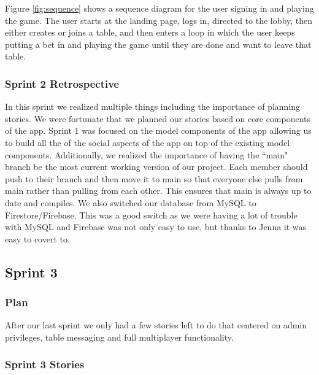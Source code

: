 \noindent Figure \ref{fig:sequence} shows a sequence diagram for the user signing in and playing the game. The user starts at the landing page, logs in, directed to the lobby, then either creates or joins a table, and then enters a loop in which the user keeps putting a bet in and playing the game until they are done and want to leave that table. 

\subsubsection{Sprint 2 Retrospective}
In this sprint we realized multiple things including the importance of planning stories. We were fortunate that we planned our stories based on core components of the app. Sprint 1 was focused on the model components of the app allowing us to build all the of the social aspects of the app on top of the existing model components. Additionally, we realized the importance of having the ``main" branch be the most current working version of our project. Each member should push to their branch and then move it to main so that everyone else pulls from main rather than pulling from each other. This ensures that main is always up to date and compiles. We also switched our database from MySQL to Firestore/Firebase. This was a good switch as we were having a lot of trouble with MySQL and Firebase was not only easy to use, but thanks to Jenna it was easy to covert to. 

\pagebreak

\subsection{Sprint 3}

\subsubsection{Plan}

\noindent After our last sprint we only had a few stories left to do that centered on admin privileges, table messaging and full multiplayer functionality.

\subsubsection{Sprint 3 Stories}

